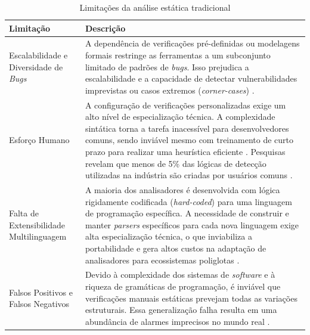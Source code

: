 \documentclass[
    12pt,                %
    openright,           %
    oneside,             %
    a4paper,             %
    english,             %
    brazil               %
]{abntex2}
\begin{document}
\begin{table}[htb]
    \centering
    \caption{Limitações da análise estática tradicional}
    \label{tab:limitacoes_analise_trad}
    \begin{tabular}{p{3.5cm}|p{11.5cm}}
        \toprule
        \textbf{Limitação} & \textbf{Descrição} \\
        \midrule
        Escalabilidade e Diversidade de \textit{Bugs} & 
        A dependência de verificações pré-definidas ou modelagens formais restringe as ferramentas a um subconjunto limitado de padrões de \textit{bugs}.
        Isso prejudica a escalabilidade e a capacidade de detectar vulnerabilidades imprevistas ou casos extremos (\textit{corner-cases}) \cite{yang2025knighter}. \\
        \midrule
        Esforço Humano & 
        A configuração de verificações personalizadas exige um alto nível de especialização técnica. 
        A complexidade sintática torna a tarefa inacessível para desenvolvedores comuns, sendo inviável mesmo com treinamento de curto prazo para realizar uma heurística eficiente \cite{hou2025generation}.
        Pesquisas revelam que menos de 5\% das lógicas de detecção utilizadas na indústria são criadas por usuários comuns \cite{hou2025generation}. \\
        \midrule
        Falta de Extensibilidade Multilinguagem &
        A maioria dos analisadores é desenvolvida com lógica rigidamente codificada (\textit{hard-coded}) para uma linguagem de programação específica. 
        A necessidade de construir e manter \textit{parsers} específicos para cada nova linguagem exige alta especialização técnica, o que inviabiliza a portabilidade e gera altos custos na adaptação de analisadores para ecossistemas poliglotas \cite{hou2025generation}. \\
        \midrule
        Falsos Positivos e Falsos Negativos & 
        Devido à complexidade dos sistemas de \textit{software} e à riqueza de gramáticas de programação, é inviável que verificações manuais estáticas prevejam todas as variações estruturais. 
        Essa generalização falha resulta em uma abundância de alarmes imprecisos no mundo real \cite{jiang2025factaligned}. \\
        \bottomrule
    \end{tabular}
\end{table}
\end{document}
